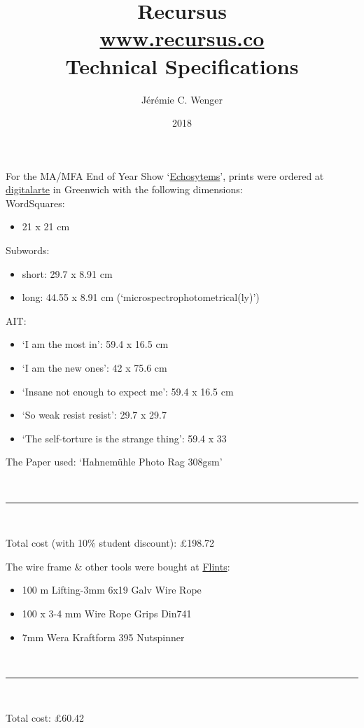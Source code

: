 \documentclass[twocolumn]{memoir}
\title{{\Huge Recursus}  \\ {\large \href{http://recursus.co/}{www.recursus.co}} \\ {\large Technical Specifications}}
\date{{\normalsize 2018}}
\author{Jérémie C. Wenger}
\providecommand{\tightlist}{%
  \setlength{\itemsep}{0pt}\setlength{\parskip}{0pt}}
\begin{document}
\maketitle
\thispagestyle{empty}

For the MA/MFA End of Year Show
`\href{http://echosystems.xyz/}{Echosytems}', prints were ordered at
\href{https://www.digitalarte.co.uk/}{digitalarte} in Greenwich with the
following dimensions: 
\\

WordSquares:

\begin{itemize}
\tightlist
\item
  21 x 21 cm
\end{itemize}

Subwords:

\begin{itemize}
\tightlist
\item
  short: 29.7 x 8.91 cm
\item
  long: 44.55 x 8.91 cm (`microspectrophotometrical(ly)')
\end{itemize}

AIT:

\begin{itemize}
\tightlist
\item
  `I am the most in': 59.4 x 16.5 cm
\item
  `I am the new ones': 42 x 75.6 cm
\item
  `Insane not enough to expect me': 59.4 x 16.5 cm
\item
  `So weak resist resist': 29.7 x 29.7
\item
  `The self-torture is the strange thing': 59.4 x 33
\end{itemize}


The Paper used: `Hahnemühle Photo Rag 308gsm'

~

\fancybreak{§}

~

Total cost (with 10\% student discount): £198.72

\vfill\null
\newpage

The wire frame \& other tools were bought at \href{http://www.flints.co.uk/content/}{Flints}:

\begin{itemize}
\tightlist
\item
  100 m Lifting-3mm 6x19 Galv Wire Rope
\item
  100 x 3-4 mm Wire Rope Grips Din741
\item
  7mm Wera Kraftform 395 Nutspinner 
\end{itemize}

~

\fancybreak{§}

~

Total cost: £60.42
\end{document}
